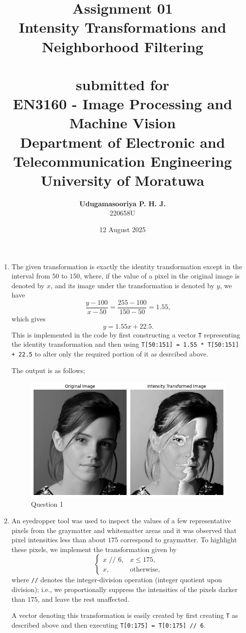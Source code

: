 \documentclass{article}[a4paper]
\title{
	\huge{\textbf{
		Assignment 01
	}}\\
	\Large{
		Intensity Transformations and Neighborhood Filtering
	}\\
	\phantom{}\\
	\large{
		submitted for
	}\\
	\LARGE{
		\textbf{EN3160 - Image Processing and Machine Vision}
	}\\
	\large{
		Department of Electronic and Telecommunication Engineering
	}
	\\
	\large{University of Moratuwa}
}
\author{
	\textbf{Udugamasooriya P. H. J.}\\
	220658U\\
}
\date{12 August 2025}
\begin{document}
\maketitle

\begin{enumerate}
	\item The given transformation is exactly the identity transformation except in the interval from $50$ to $150$, where, if
	the value of a pixel in the original image is denoted by $x$, and its image under the transformation is denoted by $y$, we have \[
		\dfrac{y - 100}{x - 50} = \dfrac{255 - 100}{150 - 50} = 1.55,
	\] which gives \[
		y = 1.55x + 22.5.
	\] This is implemented in the code by first constructing a vector \lstinline|T| representing the identity transformation and then using 
	\lstinline|T[50:151] = 1.55 * T[50:151] + 22.5| to alter only the required portion of it as desrcibed above.

	The output is as follows;
	\begin{figure}[H]
		\centering
		\includegraphics[width=0.7\linewidth]{images/q1.png}
		\caption{Question 1}
	\end{figure}

	\item An eyedropper tool was used to inspect the values of a few representative pixels from the graymatter and whitematter areas and
	it was observed that pixel intensities less than about $175$ correspond to graymatter. To highlight these pixels, we implement the transformation
	given by \[
		\begin{cases}
			x \texttt{ // } 6, & x \leq 175,		\\
			x,		& \text{otherwise},
		\end{cases}
	\] where \texttt{//} denotes the integer-division operation (integer quotient upon division); i.e., we proportionally suppress the 
	intensities of the pixels darker than $175$, and leave the rest unaffected.
	
	A vector denoting this transformation is easily created
	by first creating \lstinline|T| as described above and then executing \lstinline|T[0:175] = T[0:175] // 6|.


\end{enumerate}
\end{document}
